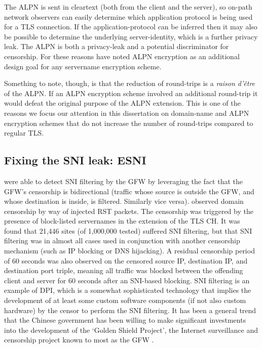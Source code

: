 The \ac{ALPN} is sent in cleartext (both from the client and the server), so on-path network observers
can easily determine which application protocol is being used for a \ac{TLS} connection.
If the application-protocol can be inferred then it may also be possible to determine the underlying server-identity,
which is a further privacy leak.
The \ac{ALPN} is both a privacy-leak and a potential discriminator for censorship.
For these reasons \cite{rfc8744-issues} have noted \ac{ALPN} encryption as an additional design goal
for any servername encryption scheme.

Something to note, though, is that the reduction of round-trips is a {\em raison d'être} of the \ac{ALPN}.
If an \ac{ALPN} encryption scheme involved an additional round-trip it would defeat the original purpose of the \ac{ALPN} extension.
This is one of the reasons we focus our attention in this dissertation on domain-name and \ac{ALPN} encryption schemes that
do not increase the number of round-trips compared to regular \ac{TLS}.

\subsection{Fixing the SNI leak: ESNI}


\cite{chai2019importance} were able to detect \ac{SNI} filtering by the \ac{GFW} by leveraging the fact that the \ac{GFW}'s censorship is bidirectional (traffic whose source is outside the \ac{GFW}, and whose destination is inside, is filtered. Similarly vice versa).
\cite{chai2019importance} observed domain censorship by way of injected \ac{RST} packets.
The censorship was triggered by the presence of block-listed servernames in the  extension of the \ac{TLS} \ac{CH}.
It was found that 21,446 sites (of 1,000,000 tested) suffered \ac{SNI} filtering,
but that \ac{SNI} filtering was in almost all cases used in conjunction with another censorship mechanism
(such as \ac{IP} blocking or \ac{DNS} hijacking).
A residual censorship period of 60 seconds was also observed on the censored source IP, destination IP, and destination port triple, meaning all traffic was blocked between the offending client and server for 60 seconds after an \ac{SNI}-based blocking.
\ac{SNI} filtering is an example of \ac{DPI},
which is a somewhat sophisticated technology that implies the development of at least
some custom software components
(if not also custom hardware)
by the censor to perform the \ac{SNI} filtering.
It has been a general trend that the Chinese
government has been willing to make
significant investments into the development
of the `Golden Shield Project',
the Internet surveillance and censorship project
known to most as the \ac{GFW} \citep{chandel-2019-great-firewall}.


